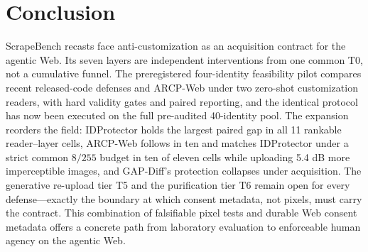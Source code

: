 \section{Conclusion}
\label{sec:conclusion}
ScrapeBench recasts face anti-customization as an acquisition contract for the
agentic Web. Its seven layers are independent interventions from one common T0,
not a cumulative funnel. The preregistered four-identity feasibility pilot
compares recent released-code defenses and ARCP-Web under two zero-shot
customization readers, with hard validity gates and paired reporting, and the
identical protocol has now been executed on the full pre-audited 40-identity
pool. The expansion reorders the field: IDProtector holds the largest paired
gap in all 11 rankable reader--layer cells, ARCP-Web follows in ten and matches
IDProtector under a strict common $8/255$ budget in ten of eleven cells while
uploading 5.4 dB more imperceptible images, and GAP-Diff's protection
collapses under acquisition. The generative re-upload tier T5 and the
purification tier T6 remain open for every defense---exactly the boundary at
which consent metadata, not pixels, must carry the contract. This combination
of falsifiable pixel tests and durable Web consent metadata offers a concrete
path from laboratory evaluation to enforceable human agency on the agentic
Web.
